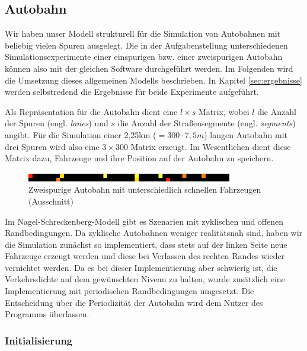 \documentclass[10pt, a4paper]{article}
\newcommand\nsm{Nagel-Schreckenberg-Modell }
\begin{document}
\subsection{Autobahn}
\label{subsec:umsetzung-autobahn}

Wir haben unser Modell strukturell für die Simulation von Autobahnen mit beliebig vielen Spuren ausgelegt. Die in der Aufgabenstellung unterschiedenen Simulationsexperimente einer einspurigen bzw. einer zweispurigen Autobahn können also mit der gleichen Software durchgeführt werden. Im Folgenden wird die Umsetzung dieses allgemeinen Modells beschrieben. In Kapitel \ref{sec:ergebnisse} werden selbstredend die Ergebnisse für beide Experimente aufgeführt.

Als Repräsentation für die Autobahn dient eine $l \times s$ Matrix, wobei $l$ die Anzahl der Spuren (engl. \emph{lanes}) und $s$ die Anzahl der Straßensegmente (engl. \emph{segments}) angibt. Für die Simulation einer 2,25km ($= 300 \cdot 7,5m$) langen Autobahn mit drei Spuren wird also eine $3 \times 300$ Matrix erzeugt. Im Wesentlichen dient diese Matrix dazu, Fahrzeuge und ihre Position auf der Autobahn zu speichern.\\

\begin{figure}[h!]
	\centering
	\includegraphics[width=0.8\textwidth]{img/twoLaneRoad}
	\caption{Zweispurige Autobahn mit unterschiedlich schnellen Fahrzeugen (Ausschnitt)}
	\label{fig:twoLaneRoad}
\end{figure}

Im \nsm gibt es Szenarien mit zyklischen und offenen Randbedingungen. Da zyklische Autobahnen weniger realitätsnah sind, haben wir die Simulation zunächst so implementiert, dass stets auf der linken Seite neue Fahrzeuge erzeugt werden und diese bei Verlassen des rechten Randes wieder vernichtet werden. Da es bei dieser Implementierung aber schwierig ist, die Verkehrsdichte auf dem gewünschten Niveau zu halten, wurde zusätzlich eine Implementierung mit periodischen Randbedingungen umgesetzt. Die Entscheidung über die Periodizität der Autobahn wird dem Nutzer des Programms überlassen.

\subsubsection{Initialisierung}
\label{subsubsec:initialisierung}
\end{document}
